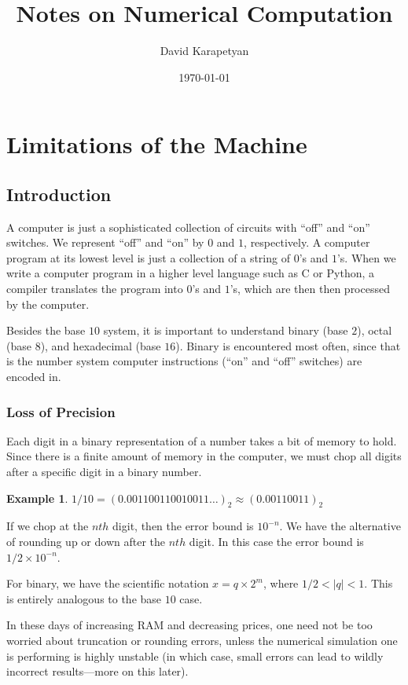 \documentclass[12pt,reqno]{amsart}
\numberwithin{equation}{section}  %
\newtheorem{example}{Example}[section]
\begin{document}
\title{Notes on Numerical Computation }
\author{David Karapetyan}
\date{\today}
\maketitle
\section{Limitations of the Machine}
\subsection{Introduction}
A computer is just a sophisticated collection of circuits
with ``off'' and ``on'' switches. We represent ``off'' and
``on'' by $0$ and $1$, respectively. A computer program 
at its lowest level is just a collection of a string of $0$'s and $1$'s.
When we write a computer program in a higher level language such as C
or Python, a compiler translates the program into $0$'s and $1$'s,
which are then then processed by the computer.

Besides the base $10$ system, it is important to understand binary (base $2$),
octal (base $8$), and hexadecimal (base $16$). Binary is encountered most often,
since that is the number system computer instructions (``on'' and ``off'' switches)
are encoded in.

\subsubsection{Loss of Precision}
Each digit in a binary representation of a number takes a bit of memory to hold.
Since there is a finite amount of memory in the computer, we must chop all digits
after a specific digit in a binary number. 
\begin{example}
$1/10 = (0.001100110010011\ldots)_2 \approx (0.00110011)_2$
\end{example}
If we chop at the $nth$ digit, then the error bound is $10^{-n}$.
We have the alternative of rounding up or down after the $nth$ digit. 
In this case the error bound is $1/2 \times 10^{-n}$.

For binary, we have the scientific notation $x = q \times 2^{m}$, where
$1/2 < |q| < 1$. This is entirely analogous to the base $10$ case.

In these days of increasing RAM and decreasing prices, one need not be too worried
about truncation or rounding errors, unless the numerical simulation one is performing
is highly unstable (in which case, small errors can lead to wildly incorrect results---more
on this later).
\end{document}
